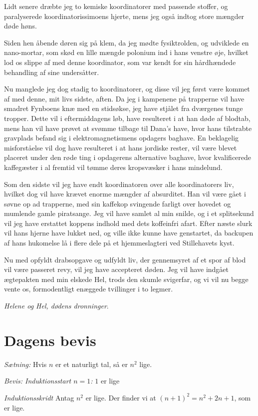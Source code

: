 \begin{minipage}[t]{150mm}
Lidt senere dræbte jeg to kemiske koordinatorer med passende stoffer, og paralyserede koordinatorissimoens hjerte, mens jeg også indtog store mængder døde høns.

Siden hen åbende døren sig på klem, da jeg mødte fysiktrolden, og udviklede en nano-mortar, som skød en lille mængde polonium ind i hans venstre øje, hvilket lod os slippe af med denne koordinator, som var kendt for sin hårdhændede behandling af sine undersåtter.

Nu manglede jeg dog stadig to koordinatorer, og disse vil jeg først være kommet af med denne, mit livs sidste, aften. Da jeg i kampenene på trapperne vil have smadret Fynboens knæ med en stidsøkse, jeg have stjålet fra dværgenes tunge tropper. Dette vil i eftermiddagens løb, have resulteret i at han døde af blodtab, mens han vil have prøvet at svømme tilbage til Dana's have, hvor hans tilstrabte gravplads befand sig i elektromagnetismens opdagers baghave. En beklagelig misforståelse vil dog have resulteret i at hans jordiske rester, vil være blevet placeret under den røde ting i opdagerens alternative baghave, hvor kvalificerede kaffegæster i al fremtid vil tømme deres kropsvæsker i hans mindelund.

Som den sidste vil jeg have endt koordinatoren over alle koordinatorers liv, hvilket dog vil have krævet enorme mængder af absurditet. Han vil være gået i søvne op ad trapperne, med sin kaffekop svingende farligt over hovedet og mumlende gamle piratsange. Jeg vil have samlet al min snilde, og i et splitsekund vil jeg have erstattet koppens indhold med dets koffeinfri afart. Efter næste slurk vil hans hjerne have lukket ned, og ville ikke kunne have genstartet, da backupen af hans hukomelse lå i flere dele på et hjemmeslagteri ved Stillehavets kyst.

Nu med opfyldt drabsopgave og udfyldt liv, der gennemsyret af et spor af blod vil være passeret revy, vil jeg have accepteret døden. Jeg vil have indgået ægtepakten med min elskede Hel, trods den skumle svigerfar, og vi vil nu begge vente os, formodentligt enæggede tvillinger i to legmer. 

\emph{Helene og Hel, dødens dronninger}. 

\section*{Dagens bevis}
\emph{Sætning:} Hvis $n$ er et naturligt tal, så er $n^2$ lige.

\emph{Bevis: Induktionsstart $n=1$:} $1$ er lige

\emph{Induktionsskridt} Antag $n^2$ er lige. Der finder vi at $(n+1)^2=n^2+2n+1$, som er lige.
 

\end{minipage}
